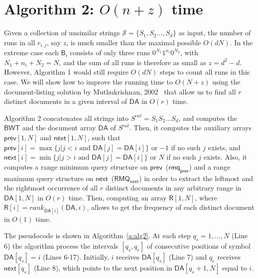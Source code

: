 \documentclass{elsarticle}
\newcommand{\DA}{\ensuremath{\mathsf{DA}}\xspace}
\newcommand{\BWT}{\ensuremath{\mathsf{BWT}}\xspace}
\newcommand{\BM}{\ensuremath{\mathsf{B}}\xspace}
\renewcommand{\S}{\mathcal{S}}
\newcommand{\R}{\ensuremath{\mathsf{R}}\xspace}
\newcommand{\RMQ}{\ensuremath{\mathsf{RMQ}}\xspace}
\newcommand{\rmq}{\ensuremath{\mathsf{rmq}}\xspace}
\newcommand{\Prev}{\ensuremath{\mathsf{prev}}\xspace}
\newcommand{\Next}{\ensuremath{\mathsf{next}}\xspace}
\begin{document}
\section{Algorithm 2: $O(n+z)$ time}\label{s:alg2}

Given a collection of unsimilar strings $\S = \{S_1, S_2 \dots, S_d\}$ as input,
the number of runs in all $r_{i,j}$, say $z$, is much smaller
than the maximal possible $O(dN)$.
In the extreme case each $\BM_i$ consists of only
three runs {$0^{N_1}1^{n_i}0^{N_2}$}, with $N_1+n_i+N_2=N$, and the sum of all runs is therefore as
small as $z=d^2-d$.
However, Algorithm 1 would still require $O(dN)$ steps to
count all runs in this case. 
We will show how to improve the running time to $O(N+z)$ using the document-listing
solution by Muthukrishnan, 2002~\cite{Muthukrishnan2002} that allow us to find
all $r$ distinct documents in a given interval of \DA in $O(r)$ time.

Algorithm 2 concatenates all strings into $S^{cat}=S_1S_2\ldots S_d$, and
computes the \BWT and the document array \DA of $S^{cat}$.
Then, it computes
the auxiliary arrays $\Prev[1,N]$ and $\Next[1,N]$, such
that $\Prev[i] = \max\{ j | j<i \mbox{ and } \DA[j]=\DA[i] \}$ or $-1$ if no
such $j$ exists, and $\Next[i] = \min\{j | j>i \mbox{ and } \DA[j]=\DA[i]\}$ or
$N$ if no such $j$ exists.
Also, it computes a range minimum query structure on \Prev\ ($\rmq_{\Prev}$) and a range
maximum query structure on \Next\ ($\RMQ_{\Next}$) in order to
extract the leftmost and the rightmost occurrence of all $r$ distinct documents
in any arbitrary range in $\DA[1,N]$ in $O(r)$ time.
Then, computing an array $\R[1,N]$, where
$\R[i]=rank_{\DA[i]}(\DA, i)$, allows to get the frequency of each distinct document
in $O(1)$ time.

The pseudocode is shown in Algorithm~\ref{a:alg2}.
At each step $q_s=1,\dots,N$ (Line 6) the algorithm process
the intervals $[q_s,q_e]$ of consecutive positions of
symbol $\DA[q_s]=i$ (Lines 6-17).
Initially, $i$ receives $\DA[q_s]$ (Line 7) and $q_e$ receives $\Next[q_s]$ (Line 8),
which points to the next position in $\DA[q_s+1,N]$ equal to $i$.
\end{document}
